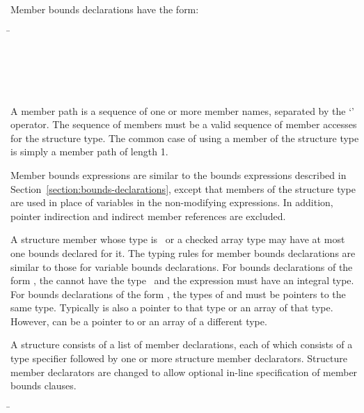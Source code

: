 Member bounds declarations have the form:
\begin{tabbing}
\=\\
\>  \code{:}  \\
\\
\\
\>  \\
\>   
\end{tabbing}

A member path is a sequence of one or more member names, separated by
the `' operator. The sequence of members must be a valid sequence of
member accesses for the structure type. The common case of using a
member of the structure type is simply a member path of length 1.

Member bounds expressions are similar to the bounds expressions
described in Section~\ref{section:bounds-declarations}, 
except that members of the structure type are
used in place of variables in the non-modifying expressions. In
addition, pointer indirection and indirect member references are
excluded.

A structure member whose type is \arrayptr\ or a
checked array type may have at most one bounds declared for it. The
typing rules for member bounds declarations are similar to those for
variable bounds declarations. For bounds declarations of the form
, the
 cannot have the type \arrayptrvoid\ and
the expression  must have an integral type. For bounds declarations
of the form ,
the types of  and  must be pointers to the same type.
Typically  is also  a pointer to that type or an
array of that type.  However,  can be a pointer to
or an array of a different type.

A structure consists of a list of member declarations, each of which
consists of a type specifier followed by one or more structure member
declarators. Structure member declarators are changed to allow 
optional in-line specification of member bounds
clauses.

\begin{tabbing}
\=\\
\>  \\
\>  \code{:}
    \\
\>  \code{:} 
 \\
\\
\end{tabbing}

